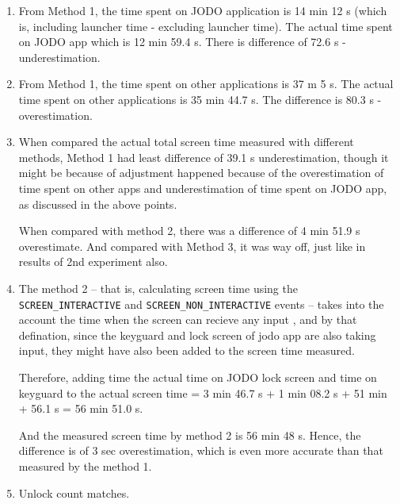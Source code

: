 \documentclass{article}
\begin{document}
\begin{enumerate}
\begin{enumerate}
\begin{table}[h]
\begin{tabular}{|p{4cm}|cc|p{2cm}|cc|}
            (51 min 56.1 s)
            & $-39.1$ s
            & --
            & $+4$ min $51.9$ s
            & $+1$ h $10$ min $32.9$ s
            & $+39$ min $04.9$ s \\
            \hline

            Time spent on other applications (35 min 44.7 s)
            & --
            & $+1$ min $20.3$ s
            & --
            & --
            & -- \\
            \hline

            \end{tabular}
            \caption{Difference between measured and actual usage metrics (Case 3)}
            \label{tab:actual_measured_case3}
        \end{table}

        \item From Method 1, the time spent on JODO application is 14 min 12 s (which is, including launcher time - excluding launcher time).
        The actual time spent on JODO app which is 12 min 59.4 s. There is difference of 72.6 s - underestimation.

        \item From Method 1, the time spent on other applications is 37 m 5 s. The actual time spent on other applications is 35 min 44.7 s. 
        The difference is 80.3 s - overestimation.

        \item When compared the actual total screen time measured with different methods, Method 1 had least difference of 39.1 s underestimation,
        though it might be because of adjustment happened because of the overestimation of time spent on other apps and underestimation of time spent on JODO app, as discussed in the above points.

        When compared with method 2, there was a difference of 4 min 51.9 s overestimate. And compared with Method 3, it was way off, just like in results of 2nd experiment also.
       
        \item The method 2 -- that is, calculating screen time using the \texttt{SCREEN\_INTERACTIVE} and \texttt{SCREEN\_NON\_INTERACTIVE} events --
        takes into the account the time when the screen can recieve any input \cite{Android_UsageEvents}, 
        and by that defination, since the keyguard and lock screen of jodo app are also taking input, they might have also been added to the screen time measured.

        Therefore, adding time the actual time on JODO lock screen and time on keyguard to the actual screen time = 3 min 46.7 s + 1 min 08.2 s + 51 min + 56.1 s = 56 min 51.0 s. 

        And the measured screen time by method 2 is 56 min 48 s. Hence, the difference is of 3 sec overestimation, which is even more accurate than that measured by the method 1.

        \item Unlock count matches.
    \end{enumerate}
\end{enumerate}
\end{document}
